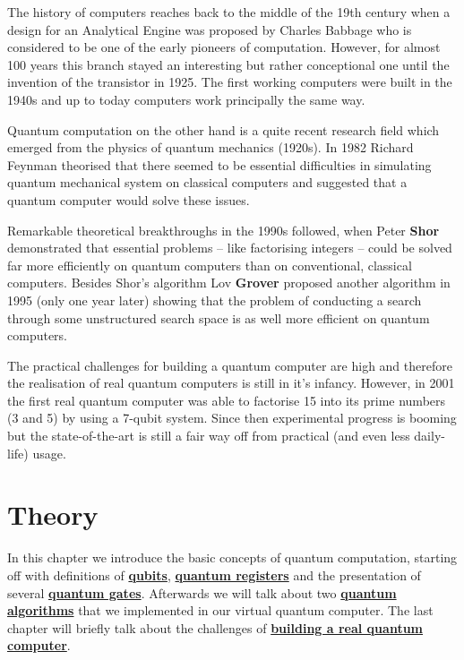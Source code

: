 \documentclass[bibliography=totocnumbered]{article}
\newcommand{\citeS}[1]{\textsuperscript{\cite{#1}}}
\theoremstyle{NoticeStyle}
\begin{document}
The history of computers reaches back to the middle of the 19th century when a design for an Analytical Engine
was proposed by Charles Babbage who is considered to be one of the early pioneers of computation. However, for almost 100 years this branch stayed an interesting but rather conceptional one until the invention of the transistor in 1925. The first working computers were built in the 1940s and up to today computers work principally the same way.

Quantum computation on the other hand is a quite recent research field which emerged from the physics of quantum mechanics (1920s). In 1982 Richard Feynman theorised that there seemed to be essential difficulties in simulating quantum mechanical system on classical computers and suggested that a quantum computer would solve these issues.\citeS{Nielsen2010}

Remarkable theoretical breakthroughs in the 1990s followed, when Peter \textbf{Shor} demonstrated that essential problems -- like factorising integers -- could be solved far more efficiently on quantum computers than on conventional, classical computers. Besides Shor's algorithm Lov \textbf{Grover} proposed another algorithm in 1995 (only one year later) showing that the problem of conducting a search through some unstructured search space is as well more efficient on quantum computers.

The practical challenges for building a quantum computer are high and therefore the realisation of real quantum computers is still in it's infancy. However, in 2001 the first real quantum computer was able to factorise 15 into its prime numbers (3 and 5) by using a 7-qubit system.\citeS{ShorsAlgoReal} Since then experimental progress is booming but the state-of-the-art is still a fair way off from practical (and even less daily-life) usage.


%
\section{Theory}

In this chapter we introduce the basic concepts of quantum computation, starting off with definitions of \hyperref[sec:Qubits]{\textbf{qubits}}, \hyperref[sec:Quantum register]{\textbf{quantum registers}} and the presentation of several \hyperref[sec:Quantum gates]{\textbf{quantum gates}}. Afterwards we will talk about two \hyperref[sec:Quantum algorithms]{\textbf{quantum algorithms}} that we implemented in our virtual quantum computer. The last chapter will briefly talk about the challenges of \hyperref[sec:Building a quantum computer]{\textbf{building a real quantum computer}}.
\end{document}
